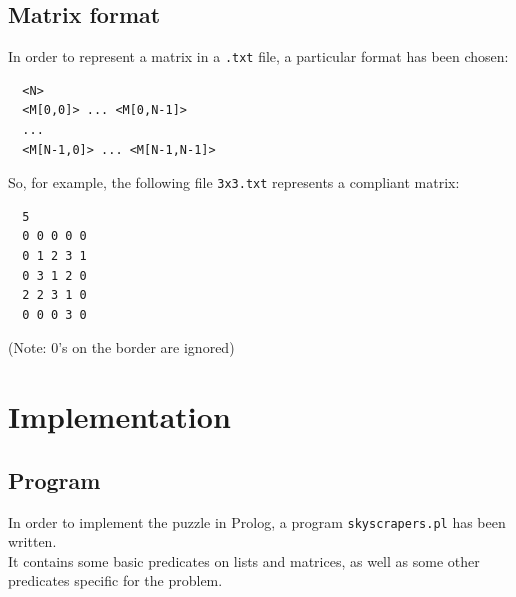 \documentclass{article}
\begin{document}
\subsection{Matrix format}
In order to represent a matrix in a \texttt{.txt} file, a particular format has been chosen:\\

\begin{verbatim}
  <N>
  <M[0,0]> ... <M[0,N-1]>
  ...
  <M[N-1,0]> ... <M[N-1,N-1]>
\end{verbatim}

\vspace{3mm}

So, for example, the following file \texttt{3x3.txt} represents a compliant matrix:\\

\begin{verbatim}
  5
  0 0 0 0 0
  0 1 2 3 1
  0 3 1 2 0
  2 2 3 1 0
  0 0 0 3 0
\end{verbatim}

(Note: 0's on the border are ignored)\\

\pagebreak

\section{Implementation}
\subsection{Program}
In order to implement the puzzle in Prolog, a program \texttt{skyscrapers.pl} has been written.\\
It contains some basic predicates on lists and matrices, as well as some other predicates specific for the problem.\\
\end{document}
